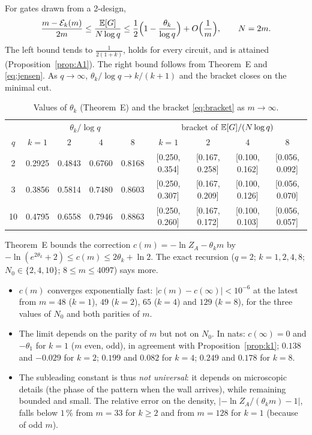 \begin{corollary}[bracket at $\alpha=1$]\label{cor:bracket}
For gates drawn from a 2-design,
\begin{equation}\label{eq:bracket}
\frac{m-\mathcal{E}_k(m)}{2m}\le\frac{\mathbb{E}[G]}{N\log q}\le\frac12\Bigl(1-\frac{\theta_k}{\log q}\Bigr)+O\Bigl(\frac1m\Bigr),\qquad N=2m .
\end{equation}
The left bound tends to $\frac1{2(1+k)}$, holds for every circuit, and is attained (Proposition~\ref{prop:A1}). The right bound follows from Theorem~E and \eqref{eq:jensen}. As $q\to\infty$, $\theta_k/\log q\to k/(k+1)$ and the bracket closes on the minimal cut.
\end{corollary}

\begin{table}[h]
\centering\footnotesize\setlength{\tabcolsep}{4.5pt}
\begin{tabular}{c|cccc|cccc}
\toprule
 & \multicolumn{4}{c|}{$\theta_k/\log q$} & \multicolumn{4}{c}{bracket of $\mathbb{E}[G]/(N\log q)$} \\
$q$ & $k=1$ & $2$ & $4$ & $8$ & $k=1$ & $2$ & $4$ & $8$\\
\midrule
2 & 0.2925 & 0.4843 & 0.6760 & 0.8168 & [0.250, 0.354] & [0.167, 0.258] & [0.100, 0.162] & [0.056, 0.092]\\
3 & 0.3856 & 0.5814 & 0.7480 & 0.8603 & [0.250, 0.307] & [0.167, 0.209] & [0.100, 0.126] & [0.056, 0.070]\\
10 & 0.4795 & 0.6558 & 0.7946 & 0.8863 & [0.250, 0.260] & [0.167, 0.172] & [0.100, 0.103] & [0.056, 0.057]\\
\bottomrule
\end{tabular}
\caption{Values of $\theta_k$ (Theorem~E) and the bracket \eqref{eq:bracket} as $m\to\infty$.}
\label{tab:theta}
\end{table}

\begin{remark}\label{rem:finitesize}
Theorem~E bounds the correction $c(m)=-\ln Z_A-\theta_km$ by $-\ln(e^{2\theta_k}+2)\le c(m)\le2\theta_k+\ln2$. The exact recursion ($q=2$; $k=1,2,4,8$; $N_0\in\{2,4,10\}$; $8\le m\le4097$) says more.
\begin{itemize}[leftmargin=*,itemsep=1pt]
\item $c(m)$ converges exponentially fast: $|c(m)-c(\infty)|<10^{-6}$ at the latest from $m=48$ ($k=1$), $49$ ($k=2$), $65$ ($k=4$) and $129$ ($k=8$), for the three values of $N_0$ and both parities of $m$.
\item The limit depends on the parity of $m$ but not on $N_0$. In nats: $c(\infty)=0$ and $-\theta_1$ for $k=1$ ($m$ even, odd), in agreement with Proposition~\ref{prop:k1}; $0.138$ and $-0.029$ for $k=2$; $0.199$ and $0.082$ for $k=4$; $0.249$ and $0.178$ for $k=8$.
\item The subleading constant is thus \emph{not universal}: it depends on microscopic details (the phase of the pattern when the wall arrives), while remaining bounded and small. The relative error on the density, $|{-\ln Z_A}/(\theta_km)-1|$, falls below $1\,\%$ from $m=33$ for $k\ge2$ and from $m=128$ for $k=1$ (because of odd $m$).
\end{itemize}
\end{remark}

